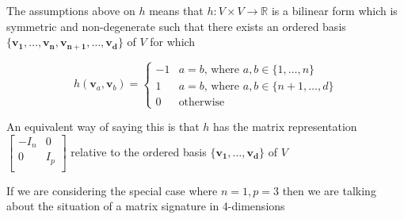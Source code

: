 
The assumptions above on $h$ means that $h: V \times V \rightarrow \mathbb{R}$ is a bilinear form which is symmetric
and non-degenerate such that there exists an ordered basis
$\{\boldsymbol{v_1}, \dots, \boldsymbol{v_n}, \boldsymbol{v_{n + 1}}, \dots, \boldsymbol{v_d}\}$ of $V$ for which

\begin{equation}
    h(\boldsymbol{v}_a, \boldsymbol{v}_b) = \begin{cases}
        -1 & a = b \text{, where } a, b \in \{1, \dots, n\}     \\
        1  & a = b \text{, where } a, b \in \{n + 1, \dots, d\} \\
        0  & \text{otherwise}
    \end{cases}
\end{equation}

An equivalent way of saying this is that $h$ has the matrix representation
$\begin{bmatrix}
    -I_n & 0 \\
    0 & I_p \\
\end{bmatrix}$ relative to the ordered basis $\{\boldsymbol{v_1}, \dots, \boldsymbol{v_d}\}$ of $V$

If we are considering the special case where $n = 1, p = 3$ then we are talking about the situation of a matrix
signature in 4-dimensions
